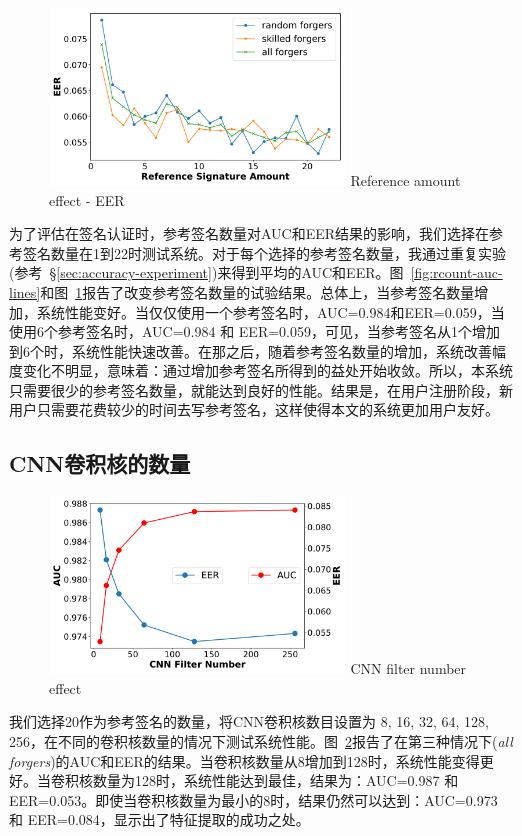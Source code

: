 \begin{figure}
  \centering
  \includegraphics[width=0.7\textwidth]{figure/rcount-eer-lines.pdf}
      {Reference amount effect - EER}
  \label{fig:rcount-eer-lines}
\end{figure}

为了评估在签名认证时，参考签名数量对AUC和EER结果的影响，我们选择在参考签名数量在1到22时测试系统。对于每个选择的参考签名数量，我通过重复实验(参考~\S\ref{sec:accuracy-experiment})来得到平均的AUC和EER。图~\ref{fig:rcount-auc-lines}和图~\ref{fig:rcount-eer-lines}报告了改变参考签名数量的试验结果。总体上，当参考签名数量增加，系统性能变好。当仅仅使用一个参考签名时，AUC=0.984和EER=0.059，当使用6个参考签名时，AUC=0.984 和 EER=0.059，可见，当参考签名从1个增加到6个时，系统性能快速改善。在那之后，随着参考签名数量的增加，系统改善幅度变化不明显，意味着：通过增加参考签名所得到的益处开始收敛。所以，本系统只需要很少的参考签名数量，就能达到良好的性能。结果是，在用户注册阶段，新用户只需要花费较少的时间去写参考签名，这样使得本文的系统更加用户友好。


\subsection{CNN卷积核的数量}
\begin{figure}
  \centering
  \includegraphics[width=0.7\textwidth]{figure/filter_number_auc_eer.pdf}
      {CNN filter number effect }
  \label{fig:filter-number-effect}
\end{figure}
我们选择20作为参考签名的数量，将CNN卷积核数目设置为 8, 16, 32, 64, 128, 256，在不同的卷积核数量的情况下测试系统性能。图~\ref{fig:filter-number-effect}报告了在第三种情况下(\textit{all forgers})的AUC和EER的结果。当卷积核数量从8增加到128时，系统性能变得更好。当卷积核数量为128时，系统性能达到最佳，结果为：AUC=0.987 和 EER=0.053。即使当卷积核数量为最小的8时，结果仍然可以达到：AUC=0.973 和 EER=0.084，显示出了特征提取的成功之处。 


